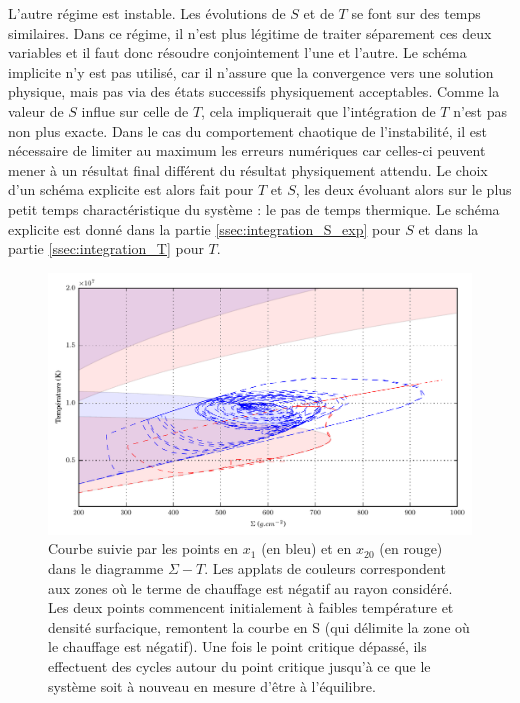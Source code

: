 L'autre régime est instable. Les évolutions de $S$ et de $T$ se font sur des temps similaires. Dans ce régime, il n'est plus légitime de traiter séparement ces deux variables et il faut donc résoudre conjointement l'une et l'autre. Le schéma implicite n'y est pas utilisé, car il n'assure que la convergence vers une solution physique, mais pas via des états successifs physiquement acceptables. Comme la valeur de $S$ influe sur celle de $T$, cela impliquerait que l'intégration de $T$ n'est pas non plus exacte. Dans le cas du comportement chaotique de l'instabilité, il est nécessaire de limiter au maximum les erreurs numériques car celles-ci peuvent mener à un résultat final différent du résultat physiquement attendu. Le choix d'un schéma explicite est alors fait pour $T$ et $S$, les deux évoluant alors sur le plus petit temps charactéristique du système : le pas de temps thermique. Le schéma explicite est donné dans la partie \ref{ssec:integration_S_exp} pour $S$ et dans la partie \ref{ssec:integration_T} pour $T$.

\begin{figure}
  \includegraphics{figures/S-T.pdf}
  \caption{Courbe suivie par les points en $x_1$ (en bleu) et en $x_{20}$ (en rouge) dans le diagramme $\Sigma-T$. Les applats de couleurs correspondent aux zones où le terme de chauffage est négatif au rayon considéré. Les deux points commencent initialement à faibles température et densité surfacique, remontent la courbe en S (qui délimite la zone où le chauffage est négatif). Une fois le point critique dépassé, ils effectuent des cycles autour du point critique jusqu'à ce que le système soit à nouveau en mesure d'être à l'équilibre. }
\end{figure}


